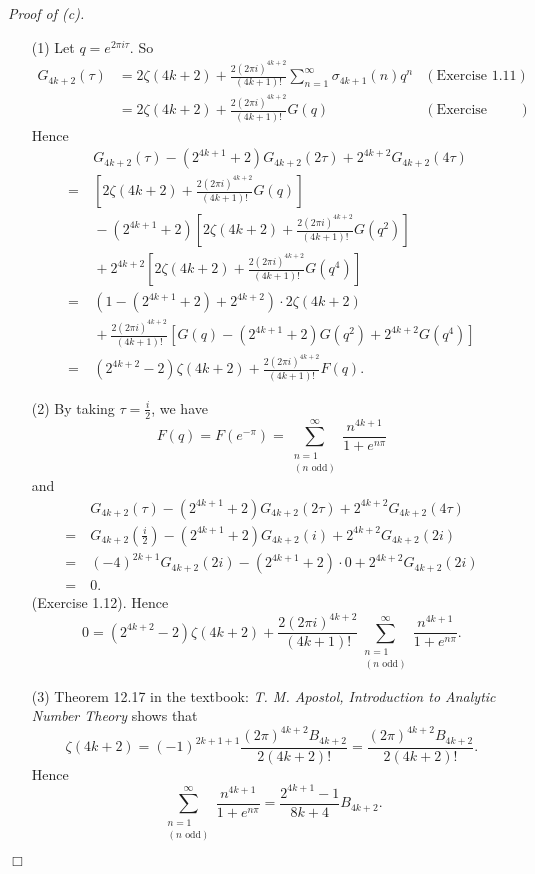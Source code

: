 \documentclass{article}
\begin{document}
\emph{Proof of (c).}
\begin{enumerate}
\item[(1)]
  Let $q = e^{2 \pi i \tau}$.
  So
  \begin{align*}
    G_{4k+2}(\tau)
    &=
    2 \zeta(4k+2)
      + \frac{2(2\pi i)^{4k+2}}{(4k+1)!} \sum_{n=1}^{\infty} \sigma_{4k+1}(n) q^n
      &(\text{Exercise 1.11}) \\
    &=
    2 \zeta(4k+2)
      + \frac{2(2\pi i)^{4k+2}}{(4k+1)!} G(q)
      &(\text{Exercise 1.14(c)})
  \end{align*}
  Hence
  \begin{align*}
    & \:
    G_{4k+2}(\tau) - (2^{4k+1} + 2) G_{4k+2}(2\tau) + 2^{4k+2} G_{4k+2}(4\tau) \\
    = &\:
      \left[ 2 \zeta(4k+2)
        + \frac{2(2\pi i)^{4k+2}}{(4k+1)!} G(q) \right] \\
    &\:
      - (2^{4k+1} + 2) \left[ 2 \zeta(4k+2)
        + \frac{2(2\pi i)^{4k+2}}{(4k+1)!} G(q^2) \right] \\
    &\:
      + 2^{4k+2} \left[ 2 \zeta(4k+2)
        + \frac{2(2\pi i)^{4k+2}}{(4k+1)!} G(q^4) \right] \\
    = &\:
    (1 - (2^{4k+1} + 2) + 2^{4k+2}) \cdot 2\zeta(4k+2) \\
    &\:
      + \frac{2(2\pi i)^{4k+2}}{(4k+1)!}
        [G(q) - (2^{4k+1} + 2)G(q^2) + 2^{4k+2}G(q^4)] \\
    = &\:
    (2^{4k+2} - 2) \zeta(4k+2)
      + \frac{2(2\pi i)^{4k+2}}{(4k+1)!} F(q).
  \end{align*}

\item[(2)]
  By taking $\tau = \frac{i}{2}$, we have
  \[
    F(q)
    = F(e^{-\pi})
    = \sum_{\substack{n=1 \\ (\text{$n$ odd})}}^{\infty} \frac{n^{4k+1}}{1+e^{n\pi}}
  \]
  and
  \begin{align*}
    & \:
    G_{4k+2}(\tau) - (2^{4k+1} + 2) G_{4k+2}(2\tau) + 2^{4k+2} G_{4k+2}(4\tau) \\
    = &\:
    G_{4k+2}\left( \frac{i}{2} \right)
      - (2^{4k+1} + 2) G_{4k+2}(i)
      + 2^{4k+2} G_{4k+2}(2i) \\
    = &\:
    (-4)^{2k+1} G_{4k+2}(2i) - (2^{4k+1} + 2) \cdot 0 + 2^{4k+2} G_{4k+2}(2i) \\
    = &\:
    0.
  \end{align*}
  (Exercise 1.12).
  Hence
  \[
    0 = (2^{4k+2} - 2) \zeta(4k+2)
    + \frac{2(2\pi i)^{4k+2}}{(4k+1)!}
    \sum_{\substack{n=1 \\ (\text{$n$ odd})}}^{\infty} \frac{n^{4k+1}}{1+e^{n\pi}}.
  \]

\item[(3)]
  Theorem 12.17 in the textbook: \emph{T. M. Apostol, Introduction to Analytic Number Theory}
  shows that
  \[
    \zeta(4k+2)
    = (-1)^{2k+1+1} \frac{(2\pi)^{4k+2} B_{4k+2}}{2(4k+2)!}
    = \frac{(2\pi)^{4k+2} B_{4k+2}}{2(4k+2)!}.
  \]
  Hence
  \[
    \sum_{\substack{n=1 \\ (\text{$n$ odd})}}^{\infty} \frac{n^{4k+1}}{1+e^{n\pi}}
    = \frac{2^{4k+1}-1}{8k+4}B_{4k+2}.
  \]
\end{enumerate}
$\Box$ \\\\



\end{document}
